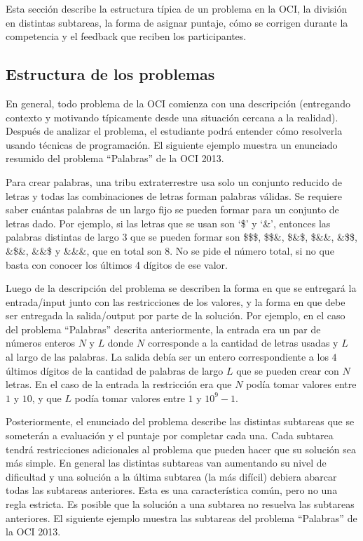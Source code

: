 Esta sección describe la estructura típica de un problema en la OCI, la división en
distintas subtareas, la forma de asignar puntaje, cómo se corrigen durante la
competencia y el feedback que reciben los participantes.

\subsection{Estructura de los problemas}

En general, todo problema de la OCI comienza con una descripción (entregando
contexto y motivando típicamente desde una situación cercana a la realidad).
Después de analizar el problema, el estudiante podrá entender cómo resolverla
usando técnicas de programación. El siguiente ejemplo muestra un enunciado
resumido del problema ``Palabras'' de la OCI 2013.

\begin{ejemplo}
Para crear palabras, una tribu extraterrestre usa solo un conjunto reducido de
letras y todas las combinaciones de letras forman palabras válidas.
Se requiere saber cuántas palabras de un largo fijo se pueden formar para un
conjunto de letras dado.
Por ejemplo, si las letras que se usan son `\$' y `\&', entonces las palabras
distintas de largo 3 que se pueden formar son \$\$\$, \$\$\&, \$\&\$, \$\&\&,
\&\$\$, \&\$\&, \&\&\$ y \&\&\&, que en total son 8.
No se pide el número total, si no que basta con conocer los últimos 4 dígitos de
ese valor.
\end{ejemplo}

Luego de la descripción del problema se describen la forma en que se entregará la
entrada/input junto con las restricciones de los valores, y la forma en que debe
ser entregada la salida/output por parte de la solución.
Por ejemplo, en el caso del problema ``Palabras'' descrita anteriormente, la
entrada era un par de números enteros $N$ y $L$ donde $N$ corresponde a la
cantidad de letras usadas y $L$ al largo de las palabras.
La salida debía ser un entero correspondiente a los $4$ últimos dígitos de la
cantidad de palabras de largo $L$ que se pueden crear con $N$ letras.
En el caso de la entrada la restricción era que $N$ podía tomar valores entre
$1$ y $10$, y que $L$ podía tomar valores entre $1$ y $10^9-1$.

Posteriormente, el enunciado del problema describe las distintas subtareas que se
someterán a evaluación y el puntaje por completar cada una.
Cada subtarea tendrá restricciones adicionales al problema que pueden hacer que su
solución sea más simple.
En general las distintas subtareas van aumentando su nivel de dificultad y una
solución a la última subtarea (la más difícil) debiera abarcar todas las subtareas
anteriores.
Esta es una característica común, pero no una regla estricta.
Es posible que la solución a una subtarea no resuelva las subtareas anteriores.
El siguiente ejemplo muestra las subtareas del problema ``Palabras'' de la OCI 2013.

